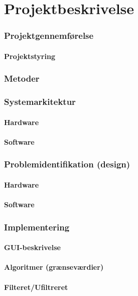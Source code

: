 \chapter{Projektbeskrivelse}
\subsection{Projektgennemførelse}
\subsubsection{Projektstyring}
\subsection{Metoder}
\subsection{Systemarkitektur}
\subsubsection{Hardware}
\subsubsection{Software}
\subsection{Problemidentifikation (design)}
\subsubsection{Hardware}
\subsubsection{Software}
\subsection{Implementering}
\subsubsection{GUI-beskrivelse}
\subsubsection{Algoritmer (grænseværdier)}
\subsubsection{Filteret/Ufiltreret}
